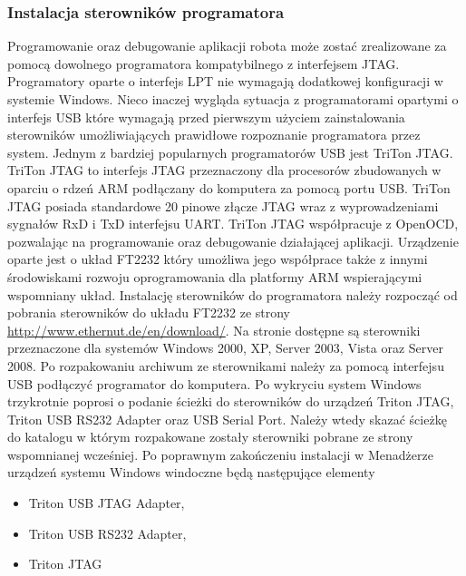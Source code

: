 \subsubsection{Instalacja sterowników programatora}
Programowanie oraz debugowanie aplikacji robota może zostać zrealizowane za
pomocą dowolnego programatora kompatybilnego z interfejsem JTAG. Programatory
oparte o interfejs LPT nie wymagają dodatkowej konfiguracji w systemie Windows.
Nieco inaczej wygląda sytuacja z programatorami opartymi o interfejs USB które
wymagają przed pierwszym użyciem zainstalowania sterowników umożliwiających
prawidłowe rozpoznanie programatora przez system. Jednym z bardziej popularnych
programatorów USB jest TriTon JTAG. TriTon JTAG to interfejs JTAG przeznaczony
dla procesorów zbudowanych w oparciu o rdzeń ARM podłączany do komputera za
pomocą portu USB. TriTon JTAG posiada standardowe 20 pinowe złącze JTAG wraz z
wyprowadzeniami sygnałów RxD i TxD interfejsu UART. TriTon JTAG współpracuje z
OpenOCD, pozwalając na programowanie oraz debugowanie działającej aplikacji.
Urządzenie oparte jest o układ FT2232 który umożliwa jego współprace także z
innymi środowiskami rozwoju oprogramowania dla platformy ARM wspierającymi
wspomniany układ. \newline \newline Instalację sterowników do programatora należy
rozpocząć od pobrania sterowników do układu FT2232 ze strony
\url{http://www.ethernut.de/en/download/}. Na stronie dostępne są sterowniki
przeznaczone dla systemów Windows 2000, XP, Server 2003, Vista oraz Server 2008.
Po rozpakowaniu archiwum ze sterownikami należy za pomocą interfejsu USB
podłączyć programator do komputera. Po wykryciu system Windows trzykrotnie
poprosi o podanie ścieżki do sterowników do urządzeń Triton JTAG, Triton USB
RS232 Adapter oraz USB Serial Port. Należy wtedy skazać ścieżkę do katalogu w
którym rozpakowane zostały sterowniki pobrane ze strony wspomnianej wcześniej.
Po poprawnym zakończeniu instalacji w Menadżerze urządzeń systemu Windows
windoczne będą następujące elementy
\begin{itemize}
  \item Triton USB JTAG Adapter,
  \item Triton USB RS232 Adapter,
  \item Triton JTAG
\end{itemize}
